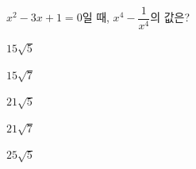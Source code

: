 $x^2-3x+1=0$일 때, $x^4-\dfrac{1}{x^4}$의 값은? 
\begin{choices32}{\rule[-3ex]{0pt}{8ex}$15\sqrt{5}$}{\rule[-3ex]{0pt}{8ex}$15\sqrt{7}$}{\rule[-3ex]{0pt}{8ex}$21\sqrt{5}$}{\rule[-3ex]{0pt}{8ex}$21\sqrt{7}$}{\rule[-3ex]{0pt}{8ex}$25\sqrt{5}$}\end{choices32}
